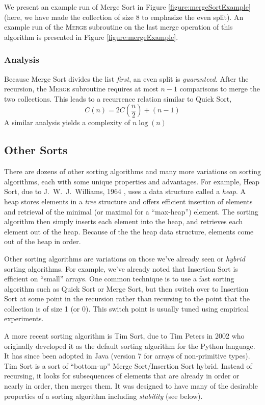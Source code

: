 We present an example run of Merge Sort in Figure \ref{figure:mergeSortExample}
(here, we have made the collection of size 8 to emphasize the even split).  
An example run of the \textsc{Merge} subroutine on the last merge operation
of this algorithm is presented in Figure \ref{figure:mergeExample}.



\subsubsection{Analysis}

Because Merge Sort divides the list \emph{first}, an even split is
\emph{guaranteed}.  After the recursion, the \textsc{Merge} subroutine
requires at most $n-1$ comparisons to merge the two collections.  This
leads to a recurrence relation similar to Quick Sort, 
  $$C(n) = 2C\left( \frac{n}{2} \right) + (n-1)$$
A similar analysis yields a complexity of 
  $n \log{(n)}$

\subsection{Other Sorts}
\label{subsection:otherSorts}

There are dozens of other sorting algorithms and many more variations on
sorting algorithms, each with some unique properties and advantages.  
For example, Heap Sort, due to J.\ W.\ J.\ Williams, 1964 
\cite{williams1964algorithm}, uses a data structure called a \emph{heap}.
  A heap stores elements in
a \emph{tree} structure and offers efficient insertion of elements and
retrieval of the minimal (or maximal for a ``max-heap'') element.  The
sorting algorithm then simply inserts each element into the heap, and
retrieves each element out of the heap.  Because of the the heap data
structure, elements come out of the heap in order.  

Other sorting algorithms are variations on those we've already seen or
\emph{hybrid} sorting algorithms.  For example, we've already noted that
Insertion Sort is efficient on ``small'' arrays.  One common technique
is to use a fast sorting algorithm such as Quick Sort or Merge Sort, but
then switch over to Insertion Sort at some point in the recursion rather
than recursing to the point that the collection is of size 1 (or 0).  
This switch point is usually tuned using empirical experiments.  

A more recent sorting algorithm is Tim Sort, due to Tim Peters in 2002 
\cite{Peters2002}  who originally 
developed it as the default sorting algorithm for the Python language.  
It has since been adopted in Java (version 7 for arrays of non-primitive 
types).  Tim Sort is a sort of ``bottom-up'' Merge Sort/Insertion Sort
hybrid.  Instead of recursing, it looks for subsequences of elements that
are already in order or nearly in order, then merges them.  It was designed
to have many of the desirable properties of a sorting algorithm 
including \emph{stability} (see below).


